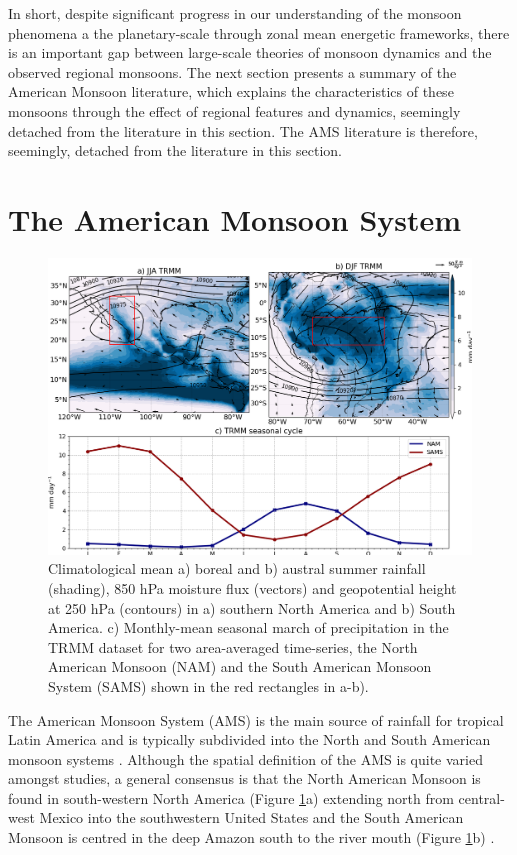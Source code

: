 In short, despite significant progress in our understanding of the monsoon phenomena a the planetary-scale through zonal mean energetic frameworks, there is an important gap between large-scale theories of monsoon dynamics and the observed regional monsoons. 
The next section presents a summary of the American Monsoon literature, which explains the characteristics of these monsoons through the effect of regional features and dynamics, seemingly detached from the literature in this section. The AMS literature is therefore, seemingly, detached from the literature in this section.

\section{The American Monsoon System}\label{sq:bk_ams}

\begin{figure}[t!]
\includegraphics[width=\linewidth]{figures/amsclim.png}
\caption[The American monsoon system climatology]{ Climatological mean a) boreal and b) austral summer rainfall (shading), 850 hPa moisture flux (vectors) and geopotential height at 250 hPa (contours) in a) southern North America and b) South America. c) Monthly-mean seasonal march of precipitation in the TRMM dataset for two area-averaged time-series, the North American Monsoon (NAM) and the South American Monsoon System (SAMS) shown in the red rectangles in a-b). }
\label{fig:americanmonsoon}
\end{figure}

The American Monsoon System (AMS) is the main source of rainfall for tropical Latin America and is typically subdivided into the North and South American monsoon systems \citep{vera2006}. 
Although the spatial definition of the AMS is quite varied amongst studies, a general consensus is that the North American Monsoon is found in south-western North America (Figure \ref{fig:americanmonsoon}a) extending north from central-west Mexico into the southwestern United States and the South American Monsoon is centred in the deep Amazon south to the river mouth (Figure \ref{fig:americanmonsoon}b) \citep{adams1997,stensrud1997,vera2006}.


